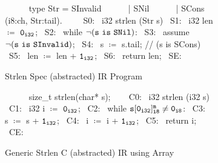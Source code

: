 \begin{figure}[htpb]
\begin{minipage}[c]{0.50\textwidth}
\begin{subfigure}[b]{1\textwidth}
\begin{center}
\begin{allLangEnvScript}
~{\tiny \textcolor{mygray}{\ \ \ }}~ type Str = SInvalid
~{\tiny \textcolor{mygray}{\ \ \ }}~          | SNil
~{\tiny \textcolor{mygray}{\ \ \ }}~          | SCons (i8:ch, Str:tail).
~{\tiny \textcolor{mygray}{   }}~ 
~{\tiny \textcolor{mygray}{S0:}}~ i32 strlen (Str s) {
~{\tiny \textcolor{mygray}{S1:}}~   i32 len $\coloneq$ $\mathrm{\tt 0_{i32}}$;
~{\tiny \textcolor{mygray}{S2:}}~   while ${\tt \neg (s\ is\ SNil)}$:
~{\tiny \textcolor{mygray}{S3:}}~     assume ${\tt \neg (s\ is\ SInvalid)}$;
~{\tiny \textcolor{mygray}{S4:}}~     s   $\coloneq$ s.tail; // (s is SCons)
~{\tiny \textcolor{mygray}{S5:}}~     len $\coloneq$ len + ${\tt 1_{i32}}$;
~{\tiny \textcolor{mygray}{S6:}}~   return len;
~{\tiny \textcolor{mygray}{SE:}}~ }
\end{allLangEnvScript}
\end{center}
\caption{\label{fig:llStrlenSpecIR}Strlen Spec (abstracted) IR Program}
\end{subfigure}
\begin{subfigure}[b]{1\textwidth}
\begin{center}
\vspace{5px}
\begin{allLangEnvScript}
~{\tiny \textcolor{mygray}{\ \ \ }}~ size_t strlen(char* s);
~{\tiny \textcolor{mygray}{}}~
~{\tiny \textcolor{mygray}{C0:}}~ i32 strlen (i32 s) {
~{\tiny \textcolor{mygray}{C1:}}~   i32 i $\coloneq$ ${\tt 0_{i32}}$;
~{\tiny \textcolor{mygray}{C2:}}~   while $\mathrm{\tt s[0_{i32}]^m_{i8} \neq 0_{i8}}$:
~{\tiny \textcolor{mygray}{C3:}}~     s $\coloneq$ s + ${\tt 1_{i32}}$;
~{\tiny \textcolor{mygray}{C4:}}~     i $\coloneq$ i + ${\tt 1_{i32}}$;
~{\tiny \textcolor{mygray}{C5:}}~   return i;
~{\tiny \textcolor{mygray}{CE:}}~ }
\end{allLangEnvScript}
\end{center}
\caption{\label{fig:llStrlenCArrIR}Generic Strlen C  (abstracted) IR using Array}
\end{subfigure}%
\end{minipage}%
\begin{minipage}[c]{0.50\textwidth}
\begin{subfigure}[b]{1\textwidth}
\begin{center}

\end{center}
\end{subfigure}
\end{minipage}
\end{figure}
